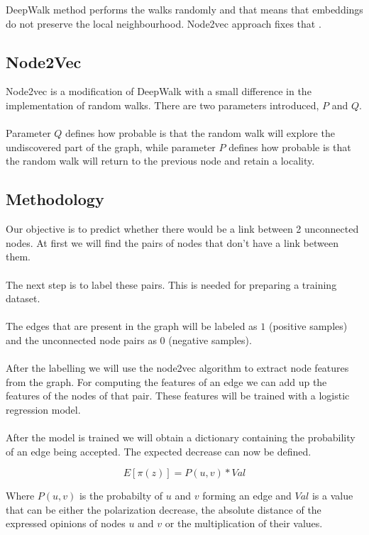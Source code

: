   \noindent  DeepWalk method performs the walks randomly and that means that embeddings do not preserve the local neighbourhood. Node2vec approach fixes that \cite{bperozzi}.

  \subsection{Node2Vec}		

  Node2vec is a modification of DeepWalk with a small difference in  the implementation of random walks. There are two parameters introduced, $P$ and $Q$. 		
 \\		
 \\		
 Parameter $Q$ defines how probable is that the random walk will explore the undiscovered part of the graph, while parameter $P$ defines how probable is that the random walk will return to the previous node and retain a locality\cite{Leskovec}.

  \subsection{Methodology}		
 \label{sec:methodology}		

Our objective is to predict whether there would be a link between 2 unconnected nodes. At first we will find the pairs of nodes that don't have a link between them.		
 \\		
 \\		
 The next step is to label these pairs. This is needed for preparing a training dataset. 
\\
\\
The edges that are present in the graph will be labeled as $1$ (positive samples) and the unconnected node pairs as $0$ (negative samples).		
 \\		
 \\		
 After the labelling we will use the node2vec algorithm to extract node features from the graph. For computing the features of an edge we can add up the features of the nodes of that pair. These features will be trained with a logistic regression model.
 \\
 \\
 After the model is trained we will obtain a dictionary containing the probability of an edge being accepted. The expected decrease can now be defined.
 
 \begin{equation} 
	 E[\pi(z)] = P(u,v) * Val
\end{equation}

\vspace{20pt}

\noindent Where $P(u,v)$ is the probabilty of $u$ and $v$ forming an edge and $Val$ is a value that can be either the polarization decrease, the absolute distance of the expressed opinions of nodes $u$ and $v$ or the multiplication of their values.
 		

  \clearpage

